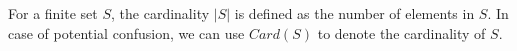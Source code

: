 \begin{definition}[Cardinality]
\label{def:cardinality}
For a finite set $S$, the cardinality $|S|$ is defined as the number of elements in $S$. In case of potential confusion, we can use $Card(S)$ to denote the cardinality of $S$.
\end{definition}

\newpage

\newpage

\newpage
